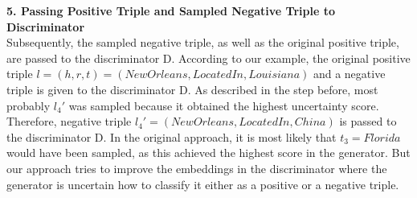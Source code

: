 \textbf{5. Passing Positive Triple and Sampled Negative Triple to Discriminator}\\
Subsequently, the sampled negative triple, as well as the original positive triple, are passed to the discriminator D.
According to our example, the original positive triple $l = (h,r,t) = (NewOrleans, LocatedIn, Louisiana)$ and a negative triple is given to the discriminator D.
As described in the step before, most probably $l_4'$ was sampled because it obtained the highest uncertainty score.
Therefore, negative triple $l_4' = (NewOrleans, LocatedIn, China)$ is passed to the discriminator D.
In the original approach, it is most likely that $t_3 = Florida$ would have been sampled, as this achieved the highest score in the generator.
But our approach tries to improve the embeddings in the discriminator where the generator is uncertain how to classify it either as a positive or a negative triple.